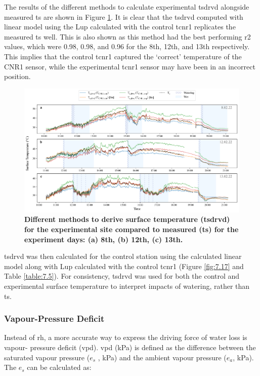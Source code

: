 \documentclass[final,3p,times,authoryear]{elsarticle}
\begin{document}
The results of the different methods to calculate experimental \gls{tsdrvd} alongside measured \gls{ts} are shown in Figure \ref{fig:7.8}. It is clear that the \gls{tsdrvd} computed with linear model using the \gls{Lup} calculated with the control \gls{tcnr1} replicates the measured \gls{ts} well. This is also shown as this method had the best performing \gls{r2} values, which were 0.98, 0.98, and 0.96 for the 8th, 12th, and 13th respectively. This implies that the control \gls{tcnr1} captured the `correct' temperature of the CNR1 sensor, while the experimental \gls{tcnr1} sensor may have been in an incorrect position.


\begin{figure}
\centering
\includegraphics[trim={0 0 0 0},clip,scale=0.50]{derive_ts.png}
\caption{\bf Different methods to derive surface temperature (\gls{tsdrvd}) for the experimental site compared to measured (\gls{ts}) for the experiment days: (a) 8th, (b) 12th, (c) 13th.}
 \label{fig:7.8}
\end{figure}

\gls{tsdrvd} was then calculated for the control station using the calculated linear model along with \gls{Lup} calculated with the control \gls{tcnr1} (Figure \ref{fig:7.17} and Table \ref{table:7.5}). For consistency, \gls{tsdrvd} was used for both the control and experimental surface temperature to interpret impacts of watering, rather than \gls{ts}.

\subsubsection{Vapour-Pressure Deficit}\label{sec:appendix7.4.3}

Instead of \gls{rh}, a more accurate way to express the driving force of water loss is vapour-
pressure deficit (\gls{vpd}). \gls{vpd} (kPa) is defined as the difference between the saturated
vapour pressure ($e_{s}$ , kPa) and the ambient vapour pressure ($e_{a}$, kPa).
The $e_{s}$ can be calculated as:
\end{document}
